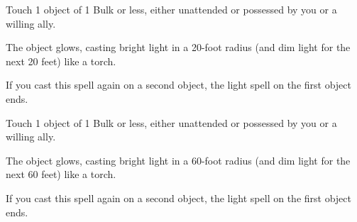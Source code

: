 




Touch 1 object of 1 Bulk or less, either unattended or possessed by you or a willing ally.

The object glows, casting bright light in a 20-foot radius (and dim light for the next 20 feet) like a torch.

If you cast this spell again on a second object, the light spell on the first object ends.






Touch 1 object of 1 Bulk or less, either unattended or possessed by you or a willing ally.

The object glows, casting bright light in a 60-foot radius (and dim light for the next 60 feet) like a torch.

If you cast this spell again on a second object, the light spell on the first object ends.